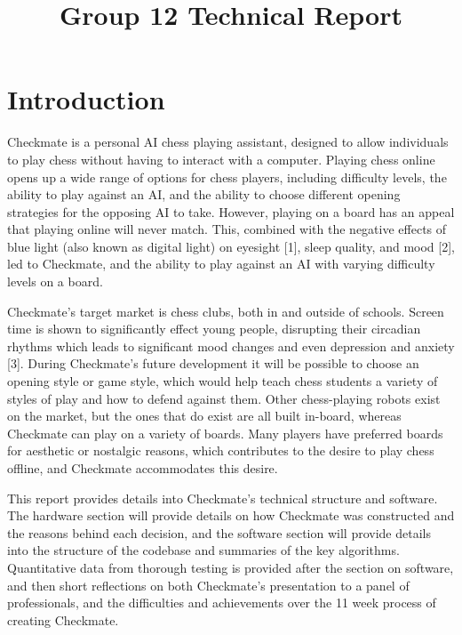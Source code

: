 \documentclass[onecolumn]{IEEEtran}
\begin{document}


\title{Group 12 Technical Report}
\maketitle

\section{Introduction}
Checkmate is a personal AI chess playing assistant, designed to allow individuals to play chess without having to interact with a computer. Playing chess online opens up a wide range of options for chess players, including difficulty levels, the ability to play against an AI, and the ability to choose different opening strategies for the opposing AI to take. However, playing on a board has an appeal that playing online will never match. This, combined with the negative effects of blue light (also known as digital light) on eyesight [1], sleep quality, and mood [2], led to Checkmate, and the ability to play against an AI with varying difficulty levels on a board. \par
Checkmate's target market is chess clubs, both in and outside of schools. Screen time is shown to significantly effect young people, disrupting their circadian rhythms which leads to significant mood changes and even depression and anxiety [3]. During Checkmate's future development it will be possible to choose an opening style or game style, which would help teach chess students a variety of styles of play and how to defend against them. Other chess-playing robots exist on the market, but the ones that do exist are all built in-board, whereas Checkmate can play on a variety of boards. Many players have preferred boards for aesthetic or nostalgic reasons, which contributes to the desire to play chess offline, and Checkmate accommodates this desire. \par
This report provides details into Checkmate's technical structure and software. The hardware section will provide details on how Checkmate was constructed and the reasons behind each decision, and the software section will provide details into the structure of the codebase and summaries of the key algorithms. Quantitative data from thorough testing is provided after the section on software, and then short reflections on both Checkmate's presentation to a panel of professionals, and the difficulties and achievements over the 11 week process of creating Checkmate. \par
\end{document}

